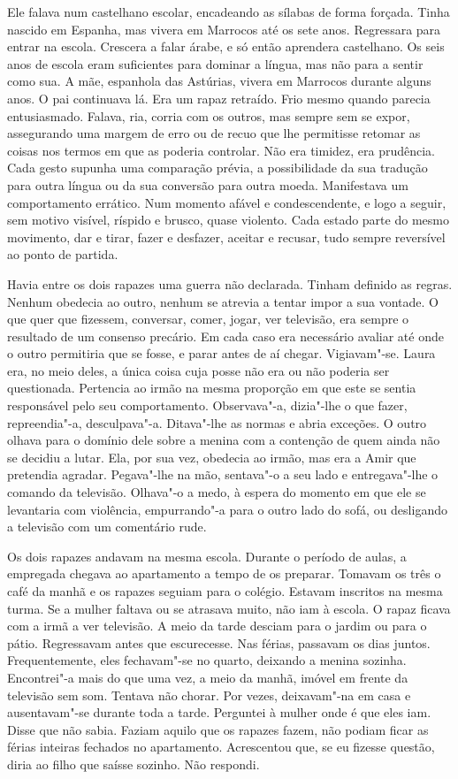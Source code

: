 Ele falava num castelhano escolar, encadeando as sílabas de forma
forçada. Tinha nascido em Espanha, mas vivera em Marrocos até os sete
anos. Regressara para entrar na escola. Crescera a falar árabe, e só
então aprendera castelhano. Os seis anos de escola eram suficientes para
dominar a língua, mas não para a sentir como sua. A mãe, espanhola das
Astúrias, vivera em Marrocos durante alguns anos. O pai continuava lá.
Era um rapaz retraído. Frio mesmo quando parecia entusiasmado. Falava,
ria, corria com os outros, mas sempre sem se expor, assegurando uma
margem de erro ou de recuo que lhe permitisse retomar as coisas nos
termos em que as poderia controlar. Não era timidez, era prudência. Cada
gesto supunha uma comparação prévia, a possibilidade da sua tradução
para outra língua ou da sua conversão para outra moeda. Manifestava um
comportamento errático. Num momento afável e condescendente, e logo a
seguir, sem motivo visível, ríspido e brusco, quase violento. Cada
estado parte do mesmo movimento, dar e tirar, fazer e desfazer, aceitar
e recusar, tudo sempre reversível ao ponto de partida.

Havia entre os dois rapazes uma guerra não declarada. Tinham definido as
regras. Nenhum obedecia ao outro, nenhum se atrevia a tentar impor a sua
vontade. O que quer que fizessem, conversar, comer, jogar, ver
televisão, era sempre o resultado de um consenso precário. Em cada caso
era necessário avaliar até onde o outro permitiria que se fosse, e parar
antes de aí chegar. Vigiavam"-se. Laura era, no meio deles, a única
coisa cuja posse não era ou não poderia ser questionada. Pertencia ao
irmão na mesma proporção em que este se sentia responsável pelo seu
comportamento. Observava"-a, dizia"-lhe o que fazer, repreendia"-a,
desculpava"-a. Ditava"-lhe as normas e abria exceções. O outro olhava
para o domínio dele sobre a menina com a contenção de quem ainda não se
decidiu a lutar. Ela, por sua vez, obedecia ao irmão, mas era a Amir que
pretendia agradar. Pegava"-lhe na mão, sentava"-o a seu lado e
entregava"-lhe o comando da televisão. Olhava"-o a medo, à espera do
momento em que ele se levantaria com violência, empurrando"-a para o
outro lado do sofá, ou desligando a televisão com um comentário rude.

Os dois rapazes andavam na mesma escola. Durante o período de aulas, a
empregada chegava ao apartamento a tempo de os preparar. Tomavam os três
o café da manhã e os rapazes seguiam para o colégio. Estavam inscritos
na mesma turma. Se a mulher faltava ou se atrasava muito, não iam à
escola. O rapaz ficava com a irmã a ver televisão. A meio da tarde
desciam para o jardim ou para o pátio. Regressavam antes que
escurecesse. Nas férias, passavam os dias juntos. Frequentemente, eles
fechavam"-se no quarto, deixando a menina sozinha. Encontrei"-a mais do
que uma vez, a meio da manhã, imóvel em frente da televisão sem som.
Tentava não chorar. Por vezes, deixavam"-na em casa e ausentavam"-se
durante toda a tarde. Perguntei à mulher onde é que eles iam. Disse que
não sabia. Faziam aquilo que os rapazes fazem, não podiam ficar as
férias inteiras fechados no apartamento. Acrescentou que, se eu fizesse
questão, diria ao filho que saísse sozinho. Não respondi.

